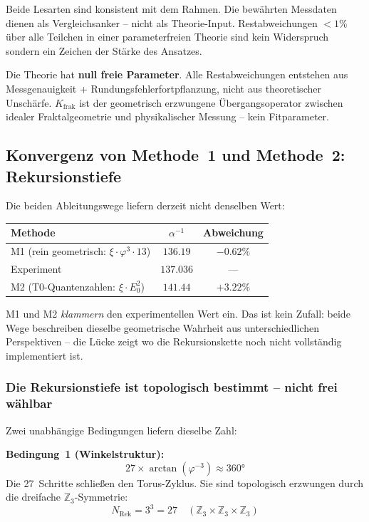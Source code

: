 \documentclass[12pt, a4paper]{article}
\newcommand{\xipar}{\xi}
\newcommand{\Kfrak}{K_{\text{frak}}}
\begin{document}
Beide Lesarten sind konsistent mit dem Rahmen. Die bewährten Messdaten dienen als Vergleichsanker -- nicht als Theorie-Input. Restabweichungen $< 1\%$ über alle Teilchen in einer parameterfreien Theorie sind kein Widerspruch sondern ein Zeichen der Stärke des Ansatzes.

\begin{tcolorbox}[colback=T0gray, colframe=T0blue, title=Kernaussage zur Präzision]
Die Theorie hat \textbf{null freie Parameter}. Alle Restabweichungen entstehen aus Messgenauigkeit + Rundungsfehlerfortpflanzung, nicht aus theoretischer Unschärfe. $\Kfrak$ ist der geometrisch erzwungene Übergangsoperator zwischen idealer Fraktalgeometrie und physikalischer Messung -- kein Fitparameter.
\end{tcolorbox}

\subsection{Konvergenz von Methode~1 und Methode~2: Rekursionstiefe}

Die beiden Ableitungswege liefern derzeit nicht denselben Wert:

\begin{center}
\begin{tabular}{lcc}
\toprule
Methode & $\alpha^{-1}$ & Abweichung \\
\midrule
M1 (rein geometrisch: $\xipar\cdot\varphi^3\cdot 13$) & $136.19$ & $-0.62\%$ \\
Experiment & $137.036$ & --- \\
M2 (T0-Quantenzahlen: $\xipar\cdot E_0^2$) & $141.44$ & $+3.22\%$ \\
\bottomrule
\end{tabular}
\end{center}

M1 und M2 \emph{klammern} den experimentellen Wert ein. Das ist kein Zufall: beide Wege beschreiben dieselbe geometrische Wahrheit aus unterschiedlichen Perspektiven -- die Lücke zeigt wo die Rekursionskette noch nicht vollständig implementiert ist.

\subsubsection*{Die Rekursionstiefe ist topologisch bestimmt -- nicht frei wählbar}

Zwei unabhängige Bedingungen liefern dieselbe Zahl:

\textbf{Bedingung~1 (Winkelstruktur):}
\[
  27 \times \arctan(\varphi^{-3}) \approx 360°
\]
Die 27~Schritte schließen den Torus-Zyklus. Sie sind topologisch erzwungen durch die dreifache $\mathbb{Z}_3$-Symmetrie:
\[
  N_{\text{Rek}} = 3^3 = 27 \quad (\mathbb{Z}_3 \times \mathbb{Z}_3 \times \mathbb{Z}_3)
\]
\end{document}
